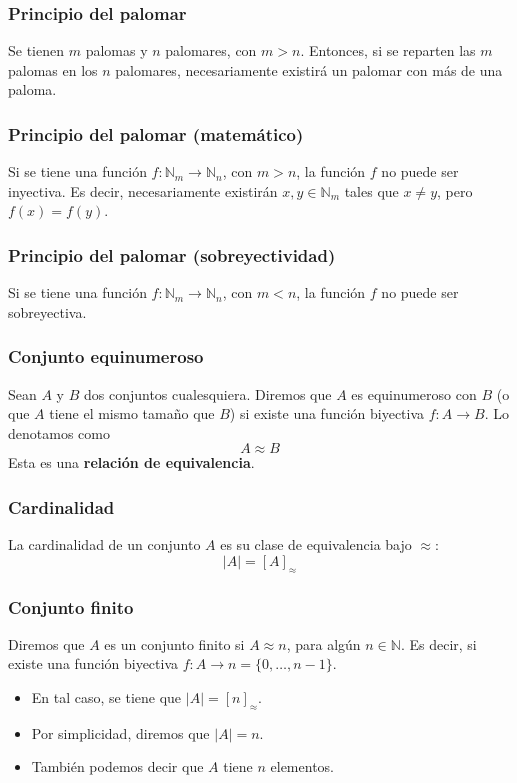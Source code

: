 \begin{multicols}{2}
    \subsubsection*{Principio del palomar}
    Se tienen $m$ palomas y $n$ palomares, con $m > n$. Entonces, si se reparten las $m$ palomas en los $n$ palomares, necesariamente existirá un palomar con más de una paloma.
    
    \subsubsection*{Principio del palomar (matemático)}
    Si se tiene una función $f: \mathbb{N}_m \rightarrow \mathbb{N}_n$, con $m > n$, la función $f$ no puede ser inyectiva. Es decir, necesariamente existirán $x,y \in \mathbb{N}_m$ tales que $x \neq y$, pero $f(x) = f(y)$.
    
    \subsubsection*{Principio del palomar (sobreyectividad)}
    Si se tiene una función $f: \mathbb{N}_m \rightarrow \mathbb{N}_n$, con $m < n$, la función $f$ no puede ser sobreyectiva.
    
    \subsubsection*{Conjunto equinumeroso}
    Sean $A$ y $B$ dos conjuntos cualesquiera. Diremos que $A$ es equinumeroso con $B$ (o que $A$ tiene el mismo tamaño que $B$) si existe una función biyectiva $f: A \rightarrow B$. Lo denotamos como
    $$
    A \approx B
    $$
    Esta es una \textbf{relación de equivalencia}.
    
    \subsubsection*{Cardinalidad}
    La cardinalidad de un conjunto $A$ es su clase de equivalencia bajo $\approx$:
    $$
    |A| = [A]_\approx
    $$
    
    \subsubsection*{Conjunto finito}
    Diremos que $A$ es un conjunto finito si $A \approx n$, para algún $n \in \mathbb{N}$. Es decir, si existe una función biyectiva $f: A \rightarrow n = \{0,\ldots, n - 1\}$.
    \begin{itemize}
        \item En tal caso, se tiene que $|A| = [n]_\approx$.
        \item Por simplicidad, diremos que $|A| = n$.
        \item También podemos decir que $A$ tiene $n$ elementos.
    \end{itemize}
    

\end{multicols}
